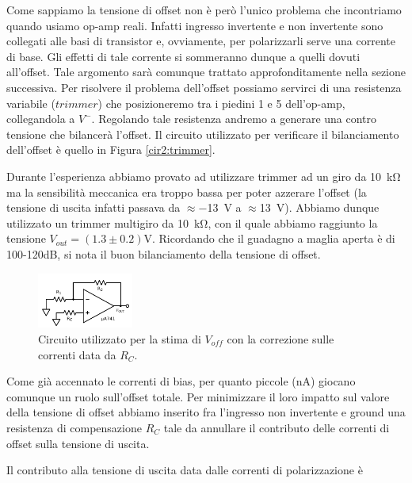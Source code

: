 Come sappiamo la tensione di offset non è però l'unico problema che incontriamo quando usiamo op-amp reali. Infatti ingresso invertente e non invertente sono collegati alle basi di transistor e, ovviamente, per polarizzarli serve una corrente di base. Gli effetti di tale corrente si sommeranno dunque a quelli dovuti all'offset. Tale argomento sarà comunque trattato approfonditamente nella sezione successiva. Per risolvere il problema dell'offset possiamo servirci di una resistenza variabile ($trimmer$) che posizioneremo tra i piedini 1 e 5 dell'op-amp, collegandola a $V^-$. Regolando tale resistenza andremo a generare una contro tensione che bilancerà l'offset. Il circuito utilizzato per verificare il bilanciamento dell'offset è quello in Figura \ref{cir2:trimmer}.

Durante l'esperienza abbiamo provato ad utilizzare trimmer ad un giro da \SI{10}{\kilo\ohm} ma la sensibilità meccanica era troppo bassa per poter azzerare l'offset (la tensione di uscita infatti passava da $\approx$\SI{-13}{\volt} a $\approx$\SI{+13}{\volt}). Abbiamo dunque utilizzato un trimmer multigiro da \SI{10}{\kilo\ohm}, con il quale abbiamo raggiunto la tensione $V_{out}= (1.3\pm0.2)\si{\volt}$. Ricordando che il guadagno a maglia aperta è di 100-120dB, si nota il buon bilanciamento della tensione di offset.

\begin{figure}
  \begin{center}
    \includegraphics[width=0.280\textwidth]{../E02/latex/current_correction.pdf}
  \end{center}
  \caption{Circuito utilizzato per la stima di $V_{off}$ con la correzione sulle correnti data da $R_C$.}
  \label{cir2:current_correction}
\end{figure}

Come già accennato le correnti di bias, per quanto piccole (\si{\nano\ampere}) giocano comunque un ruolo sull'offset totale. Per minimizzare il loro impatto sul valore della tensione di offset abbiamo inserito fra l'ingresso non invertente e ground una resistenza di compensazione $R_C$ tale da annullare il contributo delle correnti di offset sulla tensione di uscita.

Il contributo alla tensione di uscita data dalle correnti di polarizzazione è

